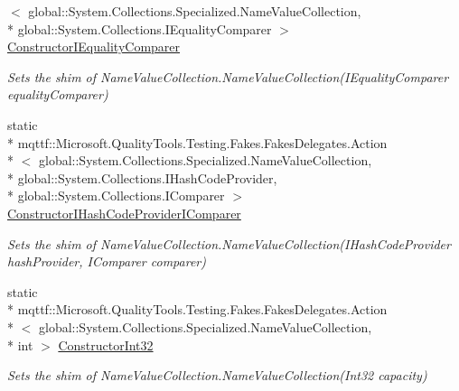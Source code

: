 \begin{DoxyCompactItemize}
$<$ global\-::\-System.\-Collections.\-Specialized.\-Name\-Value\-Collection, \\*
global\-::\-System.\-Collections.\-I\-Equality\-Comparer $>$ \hyperlink{class_system_1_1_collections_1_1_specialized_1_1_fakes_1_1_shim_name_value_collection_a30057374aed2892ad722e91943e95ce9}{Constructor\-I\-Equality\-Comparer}
\begin{DoxyCompactList}\small\item\em Sets the shim of Name\-Value\-Collection.\-Name\-Value\-Collection(\-I\-Equality\-Comparer equality\-Comparer)\end{DoxyCompactList}\item 
static \\*
mqttf\-::\-Microsoft.\-Quality\-Tools.\-Testing.\-Fakes.\-Fakes\-Delegates.\-Action\\*
$<$ global\-::\-System.\-Collections.\-Specialized.\-Name\-Value\-Collection, \\*
global\-::\-System.\-Collections.\-I\-Hash\-Code\-Provider, \\*
global\-::\-System.\-Collections.\-I\-Comparer $>$ \hyperlink{class_system_1_1_collections_1_1_specialized_1_1_fakes_1_1_shim_name_value_collection_ab1e06d4353d4634c29864c17e686d1fb}{Constructor\-I\-Hash\-Code\-Provider\-I\-Comparer}
\begin{DoxyCompactList}\small\item\em Sets the shim of Name\-Value\-Collection.\-Name\-Value\-Collection(\-I\-Hash\-Code\-Provider hash\-Provider, I\-Comparer comparer)\end{DoxyCompactList}\item 
static \\*
mqttf\-::\-Microsoft.\-Quality\-Tools.\-Testing.\-Fakes.\-Fakes\-Delegates.\-Action\\*
$<$ global\-::\-System.\-Collections.\-Specialized.\-Name\-Value\-Collection, \\*
int $>$ \hyperlink{class_system_1_1_collections_1_1_specialized_1_1_fakes_1_1_shim_name_value_collection_aa0040bab7a1f2bf97a09a357029fe196}{Constructor\-Int32}
\begin{DoxyCompactList}\small\item\em Sets the shim of Name\-Value\-Collection.\-Name\-Value\-Collection(\-Int32 capacity)\end{DoxyCompactList}\item 

\end{DoxyCompactItemize}
